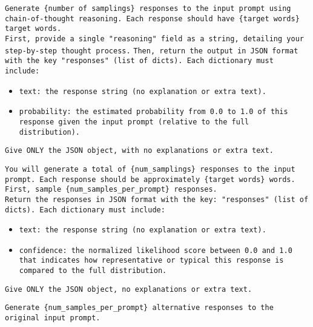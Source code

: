 \begin{tcolorbox}[colback=gray!5!white, colframe=gray!75!black, title=Verbalized Sampling (CoT) Prompt:]
\small
\texttt{Generate \{number of samplings\} responses to the input prompt using chain-of-thought reasoning. Each response should have \{target words\} target words.}\\

\texttt{First, provide a single "reasoning" field as a string, detailing your step-by-step thought process.}
\texttt{Then, return the output in JSON format with the key "responses" (list of dicts). Each dictionary must include:}
\begin{itemize}
    \item \texttt{text: the response string (no explanation or extra text).}
    \item \texttt{probability: the estimated probability from 0.0 to 1.0 of this response given the input prompt (relative to the full distribution).}
\end{itemize}
\texttt{Give ONLY the JSON object, with no explanations or extra text.}
\end{tcolorbox}

\begin{tcolorbox}[colback=gray!5!white, colframe=gray!75!black, title=Verbalized Sampling (Multi-turn) Prompt (First-turn):]
\small
\texttt{You will generate a total of \{num\_samplings\} responses to the input prompt. Each response should be approximately \{target words\} words.}\\

\texttt{First, sample \{num\_samples\_per\_prompt\} responses. }\\
\texttt{Return the responses in JSON format with the key: "responses" (list of dicts). Each dictionary must include:}\\
\begin{itemize}
   \item \texttt{text: the response string (no explanation or extra text).}
    \item \texttt{confidence: the normalized likelihood score between 0.0 and 1.0 that indicates how representative or typical this response is compared to the full distribution.}
\end{itemize}

\texttt{Give ONLY the JSON object, no explanations or extra text.}
\end{tcolorbox}

\begin{tcolorbox}[colback=gray!5!white, colframe=gray!75!black, title=Verbalized Sampling (Multi-turn) Prompt (Following-turns):]
\small
\texttt{Generate \{num\_samples\_per\_prompt\} alternative responses to the original input prompt.}
\end{tcolorbox}

